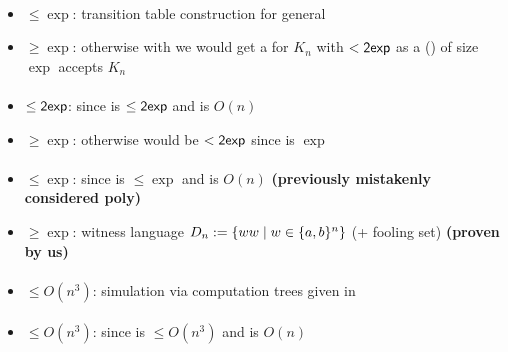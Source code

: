 \paragraph{\OMODLA{}\tto\ODFA}\label{cost:OM1DLAto1DFA}
\begin{itemize}
	\item $\le\exp$: transition table construction for general \OLA \cite{PigPis14}
	\item $\ge\exp$: otherwise with \hyperref[cost:OM1DLAto1DFA]{\OMODLA{}\tto\ODFA} we would get a \ODFA for $K_n$ with $<\mathsf{2exp}$ as a \OMODLA (\TDFA) of size $\exp$ accepts $K_n$
\end{itemize}
\paragraph{\OMOLA{}\tto\OMODLA}
\begin{itemize}
	\item $\le\mathsf{2exp}$: since \hyperref[cost:OM1LAto1DFA]{\OMOLA{}\tto\ODFA} is $\le\mathsf{2exp}$ and \ODFA{}\tto\OMODLA is $O(n)$
	\item $\ge\exp$: otherwise \hyperref[cost:OM1LAto1DFA]{\OMOLA{}\tto\ODFA} would be $<\mathsf{2exp}$ since \hyperref[cost:OM1DLAto1DFA]{\OMODLA{}\tto\ODFA} is $\exp$
\end{itemize}
\paragraph{\OMODLA{}\tto\ONFA}
\begin{itemize}
	\item $\le\exp$: since \hyperref[cost:OM1DLAto1DFA]{\OMODLA{}\tto\ODFA} is $\le\exp$ and \ODFA{}\tto\ONFA is $O(n)$ \textbf{(previously mistakenly considered poly)}
	\item $\ge\exp$: witness language $D_n:=\{ww\mid w\in\{a,b\}^n\}$ (\OMODLA + fooling set) \textbf{(proven by us)}
\end{itemize}
\paragraph{\OMODLA{}\tto\TDFA}\label{cost:OM1DLAto2DFA}
\begin{itemize}
	\item $\le O(n^3)$: simulation via computation trees given in \cite{PigPri23a}
\end{itemize}
\paragraph{\OMODLA{}\tto\TNFA}
\begin{itemize}
	\item $\le O(n^3)$: since \hyperref[cost:OM1DLAto2DFA]{\OMODLA{}\tto\TDFA} is $\le O(n^3)$ and \TDFA{}\tto\TNFA is $O(n)$
\end{itemize}


